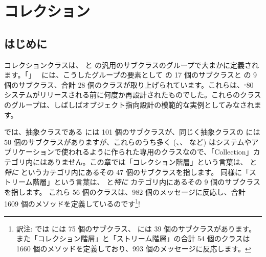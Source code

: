 \documentclass[a4paper,10pt,twoside]{book}
\begin{document}
	\sloppy
\fi
\chapter{コレクション}


\section{はじめに}

コレクションクラスは、 と  の汎用のサブクラスのグループで大まかに定義されます。「」~\cite{Gold83a} には、こうしたグループの要素として  の 17 個のサブクラスと   の 9 個のサブクラス、合計 28 個のクラスが取り上げられています。これらは、\st-80 システムがリリースされる前に何度か再設計されたものでした。これらのクラスのグループは、しばしばオブジェクト指向設計の模範的な実例としてみなされます。

\pharo では、抽象クラスである  には 101 個のサブクラスが、同じく抽象クラスの  には 50 個のサブクラスがありますが、これらのうち多く (\mbox{、}\mbox{、} など) はシステムやアプリケーションで使われるように作られた専用のクラスなので、「Collection」カテゴリ内にはありません。この章では「コレクション階層」という言葉は、 と\emph{特に}  というカテゴリ内にあるその 47 個のサブクラスを指します。
同様に「ストリーム階層」という言葉は、  と\emph{特に}  カテゴリ内にあるその 9 個のサブクラスを指します。
これら 56 個のクラスは、982 個のメッセージに反応し、合計 1609 個のメソッドを定義しているのです\footnote{訳注:  では  には 75 個のサブクラス、 には 39 個のサブクラスがあります。また「コレクション階層」と「ストリーム階層」の合計 54 個のクラスは 1660 個のメソッドを定義しており、993 個のメッセージに反応します。}!
\end{document}

